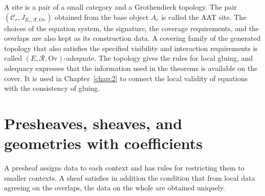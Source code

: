 A site is a pair of a small category and a Grothendieck topology.
The pair $(\mathcal{C}_r,J_{E_r,\mathcal{R},\mathrm{Ov}})$ obtained from the
base object $A_r$ is called the AAT site.
The choices of the equation system, the signature, the coverage requirements,
and the overlaps are also kept as its construction data.
A covering family of the generated topology that also satisfies the specified
visibility and interaction requirements is called
$(E,\mathcal{R},\mathrm{Ov})$-adequate.
The topology gives the rules for local gluing, and adequacy expresses that the
information used in the theorems is available on the cover.
It is used in Chapter~\ref{chap:2} to connect the local validity of equations
with the consistency of gluing.

\section{Presheaves, sheaves, and geometries with coefficients}\label{sec:1.6}

A presheaf assigns data to each context and has rules for restricting them to
smaller contexts.
A sheaf satisfies in addition the condition that from local data agreeing on the
overlaps, the data on the whole are obtained uniquely.

